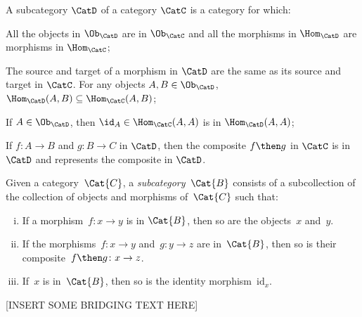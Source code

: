 \begin{shaded*}
\begin{definition}
A subcategory $\CatD$ of a category $\CatC$ is a category for which:
\begin{compactenum}
    \item All the objects in $\Ob_\CatD$ are in $\Ob_\CatC$ and all the morphisms in $\Hom_\CatD$ are morphisms in $\Hom_\CatC$;
    \item The source and target of a morphism in $\CatD$ are the same as its source and target in $\CatC$. For any objects $A,B\in \Ob_\CatD$, $\Hom_\CatD(A,B)\subseteq \Hom_\CatC(A,B)$;
    \item If $A\in \Ob_\CatD$, then $\id_A\in \Hom_\CatC(A,A)$ is in $\Hom_\CatD(A,A)$;
    \item If $f\colon A\to B$ and $g\colon B\to C$ in $\CatD$, then the composite $f\then g$ in $\CatC$ is in $\CatD$ and represents the composite in $\CatD$.
\end{compactenum}
\end{definition}
\end{shaded*}
\begin{shaded*}
\begin{definition}[Subcategory]
\label{def:subcategory}
	Given a category~$\Cat{C}$, a \emph{subcategory}~$\Cat{B}$ consists of a subcollection of the collection of objects and morphisms of~$\Cat{C}$ such that:
	\begin{enumerate}[(i)]
	\item If a morphism~$f \colon x\to y$ is in $\Cat{B}$, then so are the objects~$x$ and~$y$.
	\item If the morphisms~$f\colon x\to y$ and~$g\colon y\to z$ are in~$\Cat{B}$, then so is their composite~$f\then g\colon x\to z$.
	\item If~$x$ is in~$\Cat{B}$, then so is the identity morphism~$\text{id}_x$.
	\end{enumerate}
\end{definition}
\end{shaded*}


[INSERT SOME BRIDGING TEXT HERE]


